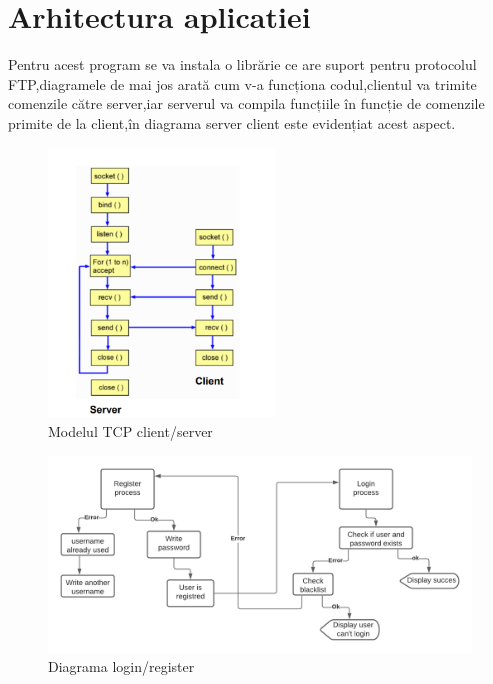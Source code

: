 \documentclass[runningheads]{llncs}
\begin{document}
\section{Arhitectura aplicatiei}

\par Pentru acest program se va instala o librărie ce are suport pentru protocolul FTP,diagramele de mai jos arată cum v-a funcționa codul,clientul va trimite comenzile către server,iar serverul va compila funcțiile în funcție de comenzile primite de la client,în diagrama server client este evidențiat acest aspect.

\begin{figure}[htp]
    \centering
    \includegraphics[width=6cm]{tcp.png}
    \caption{Modelul TCP client/server}
\end{figure}

\begin{figure}[htp]
    \centering
    \includegraphics[width=13cm]{login.png}
    \caption{Diagrama login/register}
\end{figure}

\clearpage
\end{document}
